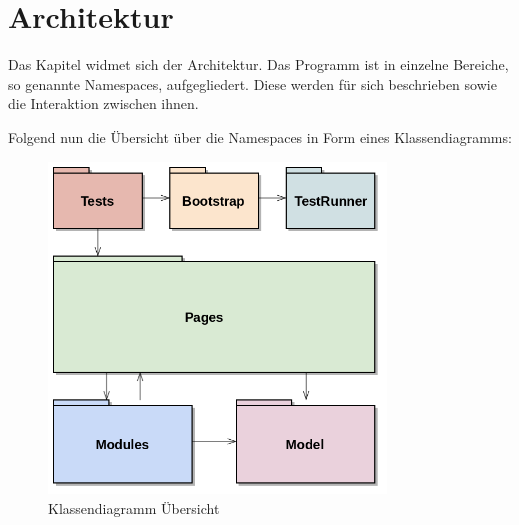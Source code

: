 \section{Architektur}
\label{sec:umsetzung:architektur}
Das Kapitel widmet sich der Architektur. Das Programm ist in einzelne Bereiche, so genannte Namespaces, aufgegliedert. Diese werden für sich beschrieben sowie die Interaktion zwischen ihnen.

Folgend nun die Übersicht über die Namespaces in Form eines Klassendiagramms:

\begin{figure}[H]
	\centering
	\includegraphics[width=0.8\textwidth]{images/semesterarbeit class diagram - overview.png}
	\caption{Klassendiagramm Übersicht}
	\label{fig:umsetzung:architektur}
\end{figure}

